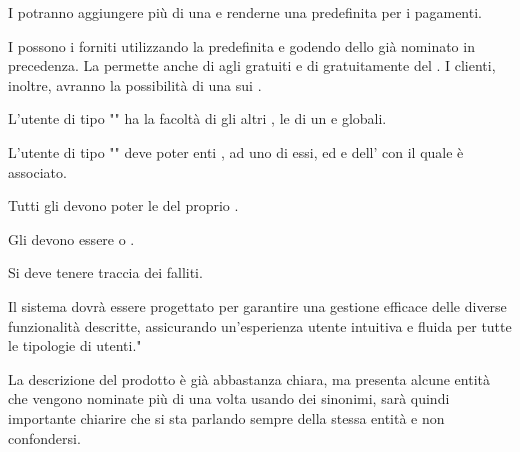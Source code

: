\begin{adjustwidth}{}{}
I  potranno aggiungere più di una  e renderne una predefinita per i pagamenti.

I  possono  i  forniti utilizzando la  predefinita e godendo dello  già nominato in precedenza. La  permette anche di  agli  gratuiti e di  gratuitamente del . 
I clienti, inoltre, avranno la possibilità di  una  sui  .

L'utente di tipo "" ha la facoltà di  gli altri ,  le  di un  e   globali.

L'utente di tipo "" deve poter  enti ,  ad uno di essi,   ed  e   dell' con il quale è associato.

Tutti gli  devono poter  le  del proprio .

Gli  devono essere  o . 

Si deve tenere traccia dei  falliti.

Il sistema dovrà essere progettato per garantire una gestione efficace delle diverse funzionalità descritte, assicurando un'esperienza utente intuitiva e fluida per tutte le tipologie di utenti."
\end{adjustwidth}
\medskip
La descrizione del prodotto è già abbastanza chiara, ma presenta alcune entità che vengono nominate più di una volta usando dei sinonimi, sarà quindi importante chiarire che si sta parlando sempre della stessa entità e non confondersi. 

